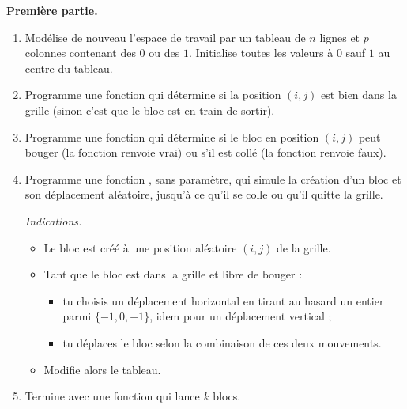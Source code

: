 \documentclass[11pt,class=report,crop=false]{standalone}
\begin{document}

\begin{activite}


\textbf{Première partie.}

\begin{enumerate}
  \item Modélise de nouveau l'espace de travail par un tableau de $n$ lignes et $p$ colonnes contenant des $0$ ou des $1$. Initialise toutes les valeurs à $0$ sauf $1$ au centre du tableau.
  
  \item Programme une fonction  qui détermine si la position $(i,j)$ est bien dans la grille (sinon c'est que le bloc est en train de sortir).
    
  \item  Programme une fonction  qui détermine si le bloc en position $(i,j)$ peut bouger (la fonction renvoie \og{}vrai\fg{}) ou s'il est collé (la fonction renvoie \og{}faux\fg{}).

  \item Programme une fonction , sans paramètre, qui simule la création d'un bloc et son déplacement aléatoire, jusqu'à ce qu'il se colle ou qu'il quitte la grille.
  
  \emph{Indications.}
  \begin{itemize}
    \item Le bloc est créé à une position aléatoire $(i,j)$ de la grille.
    \item Tant que le bloc est dans la grille et libre de bouger :
    \begin{itemize}
      \item tu choisis un déplacement horizontal en tirant au hasard un entier  parmi $\{-1,0,+1\}$, idem pour un déplacement vertical ;
      \item tu déplaces le bloc selon la combinaison de ces deux mouvements.
      \end{itemize}  
      \item Modifie alors le tableau.      
  \end{itemize}

  
    \item Termine avec une fonction  qui lance $k$ blocs.   
\end{enumerate}



\end{activite}
\end{document}

